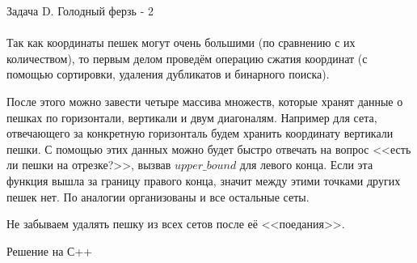 {\large Задача D. Голодный ферзь - 2} 
\\
\\
Так как координаты пешек могут очень большими (по сравнению с их количеством), то первым делом проведём операцию сжатия координат (с помощью сортировки, удаления дубликатов и бинарного поиска).

После этого можно завести четыре массива множеств, которые хранят данные о пешках по горизонтали, вертикали и двум диагоналям. Например для сета, отвечающего за конкретную горизонталь будем хранить координату вертикали пешки. С помощью этих данных можно будет быстро отвечать на вопрос <<есть ли пешки на отрезке?>>, вызвав $upper\_bound$ для левого конца. Если эта функция вышла за границу правого конца, значит между этими точками других пешек нет. По аналогии организованы и все остальные сеты.

Не забываем удалять пешку из всех сетов после её <<поедания>>.

\newpage
{\large Решение на С++}
\\
\\

